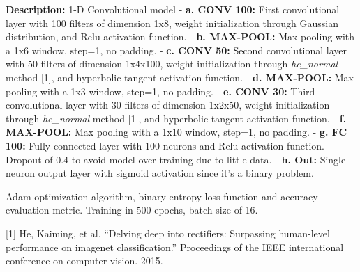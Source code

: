\documentclass[11pt]{article}
\begin{document}
\textbf{Description:} 1-D Convolutional model - \textbf{a. CONV 100:}
First convolutional layer with 100 filters of dimension 1x8, weight
initialization through Gaussian distribution, and Relu activation
function. - \textbf{b. MAX-POOL:} Max pooling with a 1x6 window, step=1,
no padding. - \textbf{c. CONV 50:} Second convolutional layer with 50
filters of dimension 1x4x100, weight initialization through
\emph{he\_normal} method {[}1{]}, and hyperbolic tangent activation
function. - \textbf{d. MAX-POOL:} Max pooling with a 1x3 window, step=1,
no padding. - \textbf{e. CONV 30:} Third convolutional layer with 30
filters of dimension 1x2x50, weight initialization through
\emph{he\_normal} method {[}1{]}, and hyperbolic tangent activation
function. - \textbf{f. MAX-POOL:} Max pooling with a 1x10 window,
step=1, no padding. - \textbf{g. FC 100:} Fully connected layer with 100
neurons and Relu activation function. Dropout of 0.4 to avoid model
over-training due to little data. - \textbf{h. Out:} Single neuron
output layer with sigmoid activation since it's a binary problem.

Adam optimization algorithm, binary entropy loss function and accuracy
evaluation metric. Training in 500 epochs, batch size of 16.

{[}1{]} He, Kaiming, et al. ``Delving deep into rectifiers: Surpassing
human-level performance on imagenet classification.'' Proceedings of the
IEEE international conference on computer vision. 2015.
\end{document}

